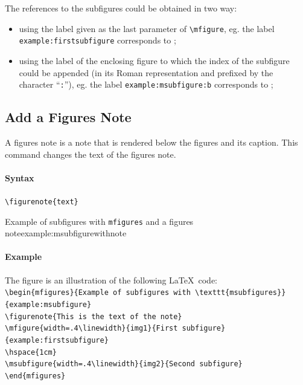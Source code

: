 \documentclass[book,taskpackage,specpackage,codepackage]{upmethodology-document}
\begin{document}
The references to the subfigures could be obtained in two way:\nopagebreak\begin{itemize}
\item using the label given as the last parameter of \texttt{{\textbackslash}mfigure}, eg. the label \texttt{example:firstsubfigure} corresponds to ;
\item using the label of the enclosing figure to which the index of the subfigure could be appended (in its Roman representation and prefixed by the character ``\texttt{:}''), eg. the label \texttt{example:msubfigure:b} corresponds to ;
\end{itemize}

\subsection{Add a Figures Note}

A figures note is a note that is rendered below the figures and its caption.
This command changes the text of the figures note.

\paragraph{Syntax} \texttt{{\textbackslash}figurenote\{text\}}

\begin{mfigures}{Example of subfigures with \texttt{mfigures} and a figures note}{example:msubfigurewithnote}
	\hspace{1cm}
\end{mfigures}


\paragraph{Example} The figure  is an illustration of the following \LaTeX\ code: \\
\texttt{{\textbackslash}begin\{mfigures\}\{Example of subfigures with {\textbackslash}texttt\{msubfigures\}\}\{example:msubfigure\}}\\
\texttt{{\textbackslash}figurenote\{This is the text of the note\}}\\
\texttt{{\textbackslash}mfigure\{width=.4{\textbackslash}linewidth\}\{img1\}\{First subfigure\}\{example:firstsubfigure\}} \\
\texttt{{\textbackslash}hspace\{1cm\}} \\
\texttt{{\textbackslash}msubfigure\{width=.4{\textbackslash}linewidth\}\{img2\}\{Second subfigure\}} \\
\texttt{{\textbackslash}end\{mfigures\}}
\end{document}

